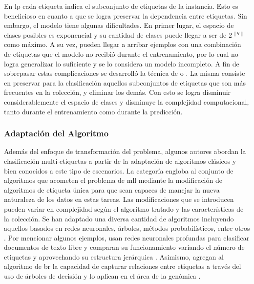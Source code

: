 En \acrshort{lp} cada etiqueta indica el subconjunto de etiquetas de la
instancia. Esto es beneficioso en cuanto a que se logra preservar la dependencia
entre etiquetas. Sin embargo, el modelo tiene algunas dificultades.  En primer
lugar, el espacio de clases posibles es exponencial y su cantidad de clases
puede llegar a ser de $2^{\left\|q\right\|}$ como máximo. A su vez, pueden
llegar a arribar ejemplos con una combinación de etiquetas que el modelo no
recibió durante el entrenamiento, por lo cual no logra generalizar lo suficiente
y se lo considera un modelo incompleto. A fin de sobrepasar estas complicaciones
se desarrolló la técnica de  o
. La misma consiste en preservar para la clasificación
aquellos subconjuntos de etiquetas que son más frecuentes en la colección, y
eliminar los demás. Con esto se logra disminuir considerablemente el espacio de
clases y disminuye la complejidad computacional, tanto durante el entrenamiento
como durante la predicción.

\subsubsection{Adaptación del Algoritmo}

Además del enfoque de transformación del problema, algunos autores abordan la
clasificación multi-etiquetas a partir de la adaptación de algoritmos clásicos y
bien conocidos a este tipo de escenarios. La categoría engloba al conjunto de
algoritmos que acometen el problema de \acrshort{mll} mediante la modificación
de algoritmos de etiqueta única para que sean capaces de manejar la nueva
naturaleza de los datos en estas tareas. Las modificaciones que se introducen
pueden variar en complejidad según el algoritmo tratado y las características de
la colección.  Se han adaptado una diversa cantidad de algoritmos incluyendo
aquellos basados en redes neuronales, árboles, métodos probabilísticos, entre
otros \cite{herrera_multilabel_2016}.  Por mencionar algunos ejemplos,
\citeauthor{gargiulo_deep_2018} usan redes neuronales profundas para clasificar
documentos de texto libre y comparan su funcionamiento variando el número de
etiquetas y aprovechando su estructura jerárquica \cite{gargiulo_deep_2018}.
Asimismo, \citeauthor{tanaka_multi-label_2015} agregan al algoritmo de
\acrshort{br} la capacidad de capturar relaciones entre etiquetas a través del
uso de árboles de decisión y lo aplican en el área de la genómica
\cite{tanaka_multi-label_2015}.

